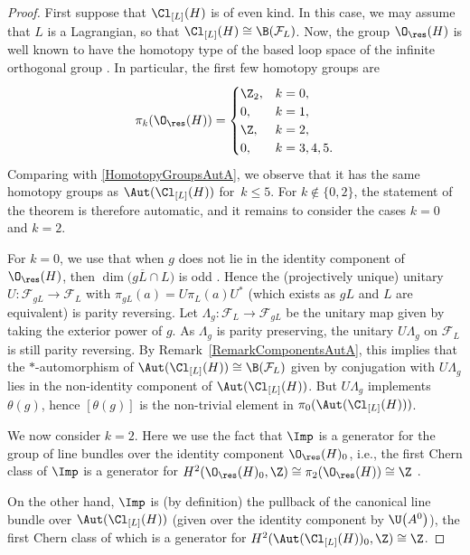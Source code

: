 \begin{proof}
First suppose that $\Cl_{[L]}(H)$ is of even kind.
In this case, we may assume that $L$ is a Lagrangian, so that $\Cl_{[L]}(H) \cong \B(\mathcal{F}_L)$.
Now, the group $\O_{\res}(H)$ is well known to have the homotopy type of the based loop space of the infinite orthogonal group \cite[Proposition~12.4.2]{PressleySegal}.
In particular, the first few homotopy groups are
\begin{equation} \label{FirstHomotopyGroupsOres}
 \pi_k(\O_{\res}(H)) = \begin{cases} \Z_2, & k=0, \\ 0, & k=1, \\ \Z, & k=2, \\ 0, & k=3, 4, 5. \end{cases}
\end{equation}
Comparing with \eqref{HomotopyGroupsAutA}, we observe that it has the same homotopy groups as $\Aut(\Cl_{[L]}(H))$ for~$k \leq 5$.
For $k\notin\{0, 2\}$, the statement of the theorem is therefore automatic, and it remains to consider the cases $k=0$ and $k=2$.

For $k=0$, we use that when $g$ does not lie in the identity component of $\O_{\res}(H)$, then $\dim\big(g \overline{L} \cap L\big)$ is odd \cite[Theorem~3.5.1]{PlymenRobinson}.
Hence the (projectively unique) unitary $U\colon \mathcal{F}_{gL} \to \mathcal{F}_L$ with $\pi_{gL}(a) = U \pi_L(a) U^*$ (which exists as $gL$ and $L$ are equivalent) is parity reversing.
Let $\Lambda_g\colon \mathcal{F}_L \to \mathcal{F}_{gL}$ be the unitary map given by taking the exterior power of $g$.
As $\Lambda_g$ is parity preserving, the unitary $U \Lambda_g$ on $\mathcal{F}_L$ is still parity reversing.
By Remark~\ref{RemarkComponentsAutA}, this implies that the $*$-automorphism of $\Aut(\Cl_{[L]}(H)) \cong \B(\mathcal{F}_L)$ given by conjugation with $U \Lambda_g$ lies in the non-identity component of $\Aut(\Cl_{[L]}(H))$. But $U \Lambda_g$ implements $\theta(g)$, hence $[\theta(g)]$ is the non-trivial element in $\pi_0(\Aut(\Cl_{[L]}(H)))$.

We now consider $k=2$.
Here we use the fact that $\Imp$ is a generator for the group of line bundles over the identity component $\O_{\res}(H)_0$, i.e., the first Chern class of $\Imp$ is a generator for $H^2(\O_{\res}(H)_0, \Z) \cong \pi_2(\O_{\res}(H)) \cong \Z$ \cite[Proposition~1.2]{SperaWurzbacherSpinors}.


On the other hand, $\Imp$ is (by definition) the pullback of the canonical line bundle over $\Aut(\Cl_{[L]}(H))$ \big(given over the identity component by $\U\big(A^0\big)$\big), the first Chern class of which is a generator for $H^2(\Aut(\Cl_{[L]}(H))_0, \Z) \cong \Z$.


\end{proof}
